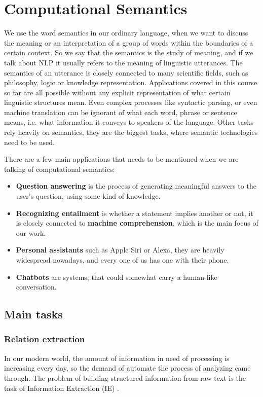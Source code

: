 \chapter*{Computational Semantics}
\label{sec:compsem}
We use the word semantics in our ordinary language, when we want to discuss the meaning or an interpretation of a group of words within the boundaries of a certain context.
So we say that the semantics is the study of meaning, and if we talk about NLP it usually refers to the meaning of linguistic utterances.
The semantics of an utterance is closely connected to many scientific fields, such as philosophy, logic or knowledge representation.
Applications covered in this course so far are all possible without any explicit representation of what certain linguistic structures mean.
Even complex processes like syntactic parsing, or even machine translation can be ignorant of what each word, phrase or sentence means, i.e. what information it conveys to speakers of the language.
Other tasks rely heavily on semantics, they are the biggest tasks, where semantic technologies need to be used.

There are a few main applications that needs to be mentioned when we are talking of computational semantics:
\begin{itemize}
	\item \textbf{Question answering} is the process of generating meaningful answers to the user's question, using some kind of knowledge.
	\item \textbf{Recognizing entailment} is whether a statement implies another or not, it is closely connected to \textbf{machine comprehension}, which is the main focus of our work.
	\item \textbf{Personal assistants} such as Apple Siri or Alexa, they are heavily widespread nowadays, and every one of us has one with their phone.
	\item \textbf{Chatbots} are systems, that could somewhat carry a human-like conversation.
\end{itemize}
\section{Main tasks}
\subsection{Relation extraction}
In our modern world, the amount of information in need of processing is increasing every day, so the demand of automate the process of analyzing came through. The problem of building structured information from raw text is the task of Information Extraction (IE) \cite{Jurafsky:2009}.

